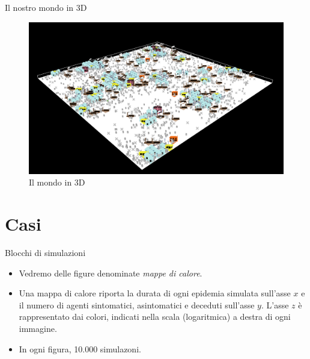 \documentclass[]{beamer}
\begin{document}
\begin{frame}{Il nostro mondo in 3D}

\begin{figure}[H]
\center
\includegraphics[scale=0.55]{world3D.png}

\caption{Il mondo in 3D}
\label{world3D}
\end{figure}

\end{frame}


\section{Casi}

\begin{frame}{Blocchi di simulazioni}

  \begin{itemize}
  \item
Vedremo delle figure denominate \emph{mappe di calore}.

\item
Una mappa di calore riporta la durata di ogni epidemia simulata sull'asse $x$ e il numero di agenti sintomatici, asintomatici e deceduti sull'asse $y$. L'asse $z$ \`{e} rappresentato dai colori, indicati nella scala (logaritmica) a destra di ogni immagine.

\item
In ogni figura, 10.000 simulazoni.

\end{itemize}
\end{frame}

\end{document}
